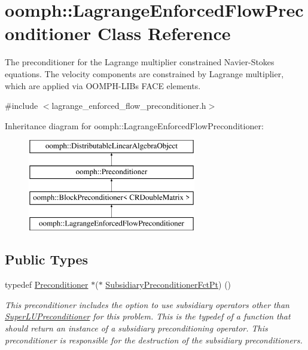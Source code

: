 \hypertarget{classoomph_1_1LagrangeEnforcedFlowPreconditioner}{}\section{oomph\+:\+:Lagrange\+Enforced\+Flow\+Preconditioner Class Reference}
\label{classoomph_1_1LagrangeEnforcedFlowPreconditioner}


The preconditioner for the Lagrange multiplier constrained Navier-\/\+Stokes equations. The velocity components are constrained by Lagrange multiplier, which are applied via O\+O\+M\+P\+H-\/\+L\+IB\textquotesingle{}s F\+A\+CE elements.  




{\ttfamily \#include $<$lagrange\+\_\+enforced\+\_\+flow\+\_\+preconditioner.\+h$>$}

Inheritance diagram for oomph\+:\+:Lagrange\+Enforced\+Flow\+Preconditioner\+:\begin{figure}[H]
\begin{center}
\leavevmode
\includegraphics[height=4.000000cm]{classoomph_1_1LagrangeEnforcedFlowPreconditioner}
\end{center}
\end{figure}
\subsection*{Public Types}
\begin{DoxyCompactItemize}
\item 
typedef \hyperlink{classoomph_1_1Preconditioner}{Preconditioner} $\ast$($\ast$ \hyperlink{classoomph_1_1LagrangeEnforcedFlowPreconditioner_a080854ab4a9c4d1f8abca5121433b1d9}{Subsidiary\+Preconditioner\+Fct\+Pt}) ()
\begin{DoxyCompactList}\small\item\em This preconditioner includes the option to use subsidiary operators other than \hyperlink{classoomph_1_1SuperLUPreconditioner}{Super\+L\+U\+Preconditioner} for this problem. This is the typedef of a function that should return an instance of a subsidiary preconditioning operator. This preconditioner is responsible for the destruction of the subsidiary preconditioners. \end{DoxyCompactList}\end{DoxyCompactItemize}

